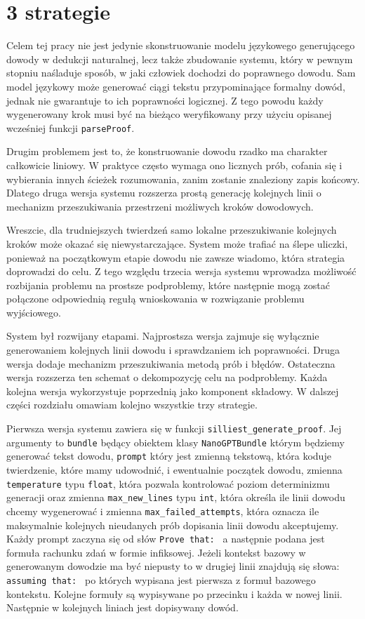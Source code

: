 \documentclass{article}
\begin{document}
\section{3 strategie}

Celem tej pracy nie jest jedynie skonstruowanie modelu językowego generującego
dowody w dedukcji naturalnej, lecz także zbudowanie systemu, który w pewnym stopniu
naśladuje sposób, w jaki człowiek dochodzi do poprawnego dowodu. Sam model językowy
może generować ciągi tekstu przypominające formalny dowód, jednak nie gwarantuje to
ich poprawności logicznej. Z tego powodu każdy wygenerowany krok musi być na bieżąco
weryfikowany przy użyciu opisanej wcześniej funkcji \texttt{parseProof}.

Drugim problemem jest to, że konstruowanie dowodu rzadko ma charakter całkowicie
liniowy. W praktyce często wymaga ono licznych prób, cofania się i wybierania innych
ścieżek rozumowania, zanim zostanie znaleziony zapis końcowy. Dlatego druga wersja
systemu rozszerza prostą generację kolejnych linii o mechanizm przeszukiwania
przestrzeni możliwych kroków dowodowych.

Wreszcie, dla trudniejszych twierdzeń samo lokalne przeszukiwanie kolejnych kroków
może okazać się niewystarczające. System może trafiać na ślepe uliczki, ponieważ
na początkowym etapie dowodu nie zawsze wiadomo, która strategia doprowadzi do celu.
Z tego względu trzecia wersja systemu wprowadza możliwość rozbijania problemu na
prostsze podproblemy, które następnie mogą zostać połączone odpowiednią regułą
wnioskowania w rozwiązanie problemu wyjściowego.

System był rozwijany etapami. Najprostsza wersja zajmuje się wyłącznie generowaniem
kolejnych linii dowodu i sprawdzaniem ich poprawności. Druga wersja dodaje mechanizm
przeszukiwania metodą prób i błędów. Ostateczna wersja rozszerza ten schemat o
dekompozycję celu na podproblemy. Każda kolejna wersja wykorzystuje poprzednią jako
komponent składowy. W dalszej części rozdziału omawiam kolejno wszystkie trzy strategie.

Pierwsza wersja systemu zawiera się w funkcji \texttt{silliest\_generate\_proof}. Jej argumenty to \texttt{bundle} będący obiektem klasy \texttt{NanoGPTBundle} 
którym będziemy generować tekst dowodu, \texttt{prompt} który jest zmienną tekstową, która koduje twierdzenie, które mamy udowodnić, i ewentualnie początek dowodu, 
zmienna \texttt{temperature} typu \texttt{float}, która pozwala kontrolować poziom determinizmu generacji oraz zmienna \texttt{max\_new\_lines} typu \texttt{int}, która określa ile linii 
dowodu chcemy wygenerować i zmienna \texttt{max\_failed\_attempts}, która oznacza ile maksymalnie kolejnych nieudanych prób dopisania linii dowodu akceptujemy. 
Każdy prompt zaczyna się od słów \texttt{Prove that: } a następnie podana jest formuła rachunku zdań w formie infiksowej. Jeżeli kontekst bazowy w generowanym dowodzie ma być niepusty 
to w drugiej linii znajdują się słowa:
\texttt{assuming that: } po których wypisana jest pierwsza z formuł bazowego kontekstu. Kolejne formuły są wypisywane po przecinku i każda w nowej linii. 
Następnie w kolejnych liniach jest dopisywany dowód.
\end{document}
